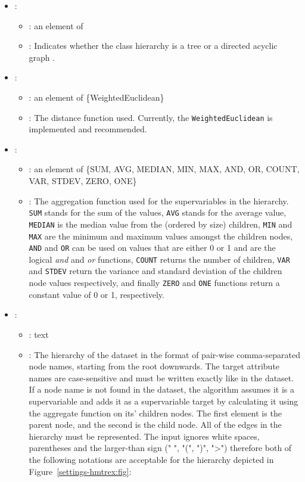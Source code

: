 \begin{itemize}
    \item {}:
           \begin{itemize}
                \item \optionPossibleValues{}: an element of 
                \item \optionDescrption{}: Indicates whether the class hierarchy is a tree or a directed acyclic graph \cite{Vens08:jrnl}.
           \end{itemize}
    \item {}:
           \begin{itemize}
                \item \optionPossibleValues{}: an element of \{WeightedEuclidean\}
                \item \optionDescrption{}: The distance function used. Currently, the {\tt WeightedEuclidean} is implemented and recommended.
           \end{itemize}
    \item {}:
           \begin{itemize}
                \item \optionPossibleValues{}: an element of \{SUM, AVG, MEDIAN, MIN, MAX, AND, OR, COUNT, VAR, STDEV, ZERO, ONE\}
                \item \optionDescrption{}:  The aggregation function used for the supervariables in the hierarchy.  {\tt SUM} stands for the sum of the values, {\tt AVG} stands for the average value, {\tt MEDIAN} is the median value from the (ordered by size) children, {\tt MIN} and {\tt MAX} are the minimum and maximum values amongst the children nodes, {\tt AND} and {\tt OR} can be used on values that are either 0 or 1 and are the logical \textit{and} and \textit{or} functions, {\tt COUNT} returns the number of children, {\tt VAR} and {\tt STDEV} return the variance and standard deviation of the children node values respectively, and finally {\tt ZERO} and {\tt ONE} functions return a constant value of 0 or 1, respectively.
           \end{itemize}
    \item {}:
           \begin{itemize}
                \item \optionPossibleValues{}: text
                \item \optionDescrption{}: The hierarchy of the dataset in the format of pair-wise comma-separated node names, starting from the root downwards. The target attribute names are case-sensitive and must be written exactly like in the dataset. If a node name is not found in the dataset, the algorithm assumes it is a supervariable and adds it as a supervariable target by calculating it using the aggregate function on its' children nodes. The first element is the parent node, and the second is the child node. All of the edges in the hierarchy must be represented. The input ignores white spaces, parentheses and the larger-than sign (" ", "(", ")", "\textgreater") therefore both of the following notations are acceptable for the hierarchy depicted in Figure~\ref{settings-hmtrex:fig}:

\end{itemize}
\end{itemize}
